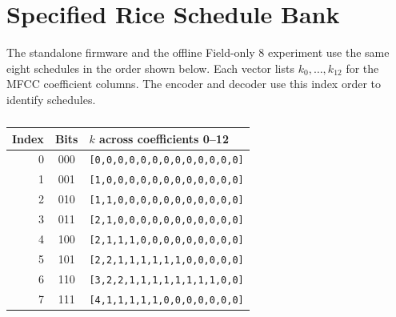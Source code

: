 \begingroup
\color{black}
\chapter{Specified Rice Schedule Bank}
\label{app:rice_bank}
The standalone firmware and the offline Field-only 8 experiment use the same eight schedules in the order shown below. Each vector lists $k_0,\ldots,k_{12}$ for the MFCC coefficient columns. The encoder and decoder use this index order to identify schedules.
\begin{table}[htbp]
\centering
\color{black}
\small
\caption{}
\label{tab:codec_bank}
\begin{tabular}{rc l}
\toprule
Index & Bits & $k$ across coefficients 0--12 \\
\midrule
0 & 000 & \texttt{[0,0,0,0,0,0,0,0,0,0,0,0,0]} \\
1 & 001 & \texttt{[1,0,0,0,0,0,0,0,0,0,0,0,0]} \\
2 & 010 & \texttt{[1,1,0,0,0,0,0,0,0,0,0,0,0]} \\
3 & 011 & \texttt{[2,1,0,0,0,0,0,0,0,0,0,0,0]} \\
4 & 100 & \texttt{[2,1,1,1,0,0,0,0,0,0,0,0,0]} \\
5 & 101 & \texttt{[2,2,1,1,1,1,1,1,0,0,0,0,0]} \\
6 & 110 & \texttt{[3,2,2,1,1,1,1,1,1,1,1,0,0]} \\
7 & 111 & \texttt{[4,1,1,1,1,1,0,0,0,0,0,0,0]} \\
\bottomrule
\end{tabular}
\end{table}
\endgroup
\FloatBarrier
